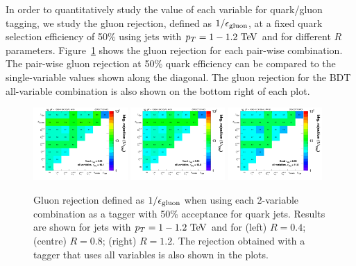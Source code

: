 In order to quantitatively study the value of each variable for quark/gluon tagging, we study the gluon 
rejection, defined as $1/\epsilon_{\rm gluon}$, at a fixed quark selection efficiency
of 50\% using jets with $\pt=1-1.2 \TeV$ and for different $R$ parameters. Figure~\ref{fig:qg_pt1000_comb} shows the gluon rejection for each pair-wise combination. 
The pair-wise gluon rejection at 50\% quark efficiency can be compared to the single-variable
values shown along the diagonal. The gluon rejection for the 
BDT all-variable combination is also shown on the bottom right of each plot.
\begin{figure}
\begin{center}
\includegraphics[width=0.32\textwidth]{./Figures/QGTagging/pT1000/AKtR04/effBkg2D.png}
\includegraphics[width=0.32\textwidth]{./Figures/QGTagging/pT1000/AKtR08/effBkg2D.png}
\includegraphics[width=0.32\textwidth]{./Figures/QGTagging/pT1000/AKtR12/effBkg2D.png}
\caption{Gluon rejection defined as $1/\epsilon_{\rm gluon}$ when using each 2-variable combination 
as a tagger with 50\% acceptance for quark jets. Results are shown for jets with $\pt=1-1.2 \TeV$ and
for (left) $R=0.4$; (centre) $R=0.8$; (right) $R=1.2$. The rejection obtained with a tagger that uses all variables is also shown
in the plots. }
\label{fig:qg_pt1000_comb}
\end{center}
\end{figure}
